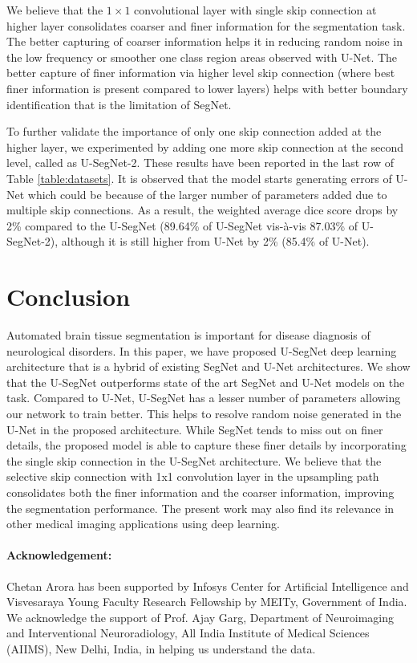 \documentclass{article}
\begin{document}
We believe that the $1\times1$ convolutional layer with single skip connection at higher layer consolidates coarser and finer information for the segmentation task. The better capturing of coarser information helps it in reducing random noise in the low frequency or smoother one class region areas observed with U-Net. The better capture of finer information via higher level skip connection (where best finer information is present compared to lower layers) helps with better boundary identification that is the limitation of SegNet.

To further validate the importance of only one skip connection added at the higher layer, we experimented by adding one more skip connection at the second level, called as U-SegNet-2. These results have been reported in the last row of Table \ref{table:datasets}. It is observed that the model starts generating errors of U-Net which could be because of the larger number of parameters added due to multiple skip connections. As a result, the weighted average dice score drops by 2\% compared to the U-SegNet (89.64\% of U-SegNet vis-\`a-vis 87.03\% of U-SegNet-2), although it is still higher from U-Net by 2\% (85.4\% of U-Net).

\section{Conclusion}

Automated brain tissue segmentation is important for disease diagnosis of neurological disorders. In this paper, we have proposed U-SegNet deep learning architecture that is a hybrid of existing SegNet and U-Net architectures. We show that the U-SegNet outperforms state of the art SegNet and U-Net models on the task. Compared to U-Net, U-SegNet has a lesser number of parameters allowing our network to train better. This helps to resolve random noise generated in the U-Net in the proposed architecture. While SegNet tends to miss out on finer details, the proposed model is able to capture these finer details by incorporating the single skip connection in the U-SegNet architecture. We believe that the selective skip connection with 1x1 convolution layer in the upsampling path consolidates both the finer information and the coarser information, improving the segmentation performance. The present work may also find its relevance in other medical imaging applications using deep learning.

\paragraph*{Acknowledgement:}

Chetan Arora has been supported by Infosys Center for Artificial Intelligence and Visvesaraya Young Faculty Research Fellowship by MEITy, Government of India. We acknowledge the support of Prof. Ajay Garg, Department of Neuroimaging and Interventional Neuroradiology, All India Institute of Medical Sciences (AIIMS), New Delhi, India, in helping us understand the data.
    


\end{document}

